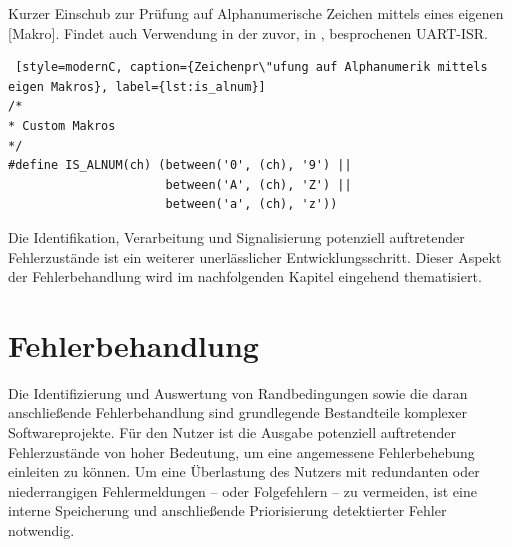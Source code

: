 \vspace{0.60cm}
Kurzer Einschub zur Pr\"ufung auf Alphanumerische Zeichen mittels eines eigenen [Makro]. Findet auch Verwendung in der zuvor, in , besprochenen UART-ISR.

\vspace{0.5cm}
\begin{lstlisting} [style=modernC, caption={Zeichenpr\"ufung auf Alphanumerik mittels eigen Makros}, label={lst:is_alnum}]
/*
* Custom Makros
*/
#define IS_ALNUM(ch) (between('0', (ch), '9') || 
					  between('A', (ch), 'Z') || 
					  between('a', (ch), 'z'))
\end{lstlisting}

Die Identifikation, Verarbeitung und Signalisierung potenziell auftretender Fehlerzust\"ande ist ein weiterer unerl\"asslicher Entwicklungsschritt. Dieser Aspekt der Fehlerbehandlung wird im nachfolgenden Kapitel eingehend thematisiert.\AI


\newpage
\section{Fehlerbehandlung}
\label{sec:Fehlerbehandlung}

Die Identifizierung und Auswertung von Randbedingungen sowie die daran anschlie{\ss}ende Fehlerbehandlung sind grundlegende Bestandteile komplexer Softwareprojekte. F\"ur den Nutzer ist die Ausgabe potenziell auftretender Fehlerzust\"ande von hoher Bedeutung, um eine angemessene Fehlerbehebung einleiten zu k\"onnen. Um eine \"Uberlastung des Nutzers mit redundanten oder niederrangigen Fehlermeldungen -- oder Folgefehlern -- zu vermeiden, ist eine interne Speicherung und anschlie{\ss}ende Priorisierung detektierter Fehler notwendig. 

